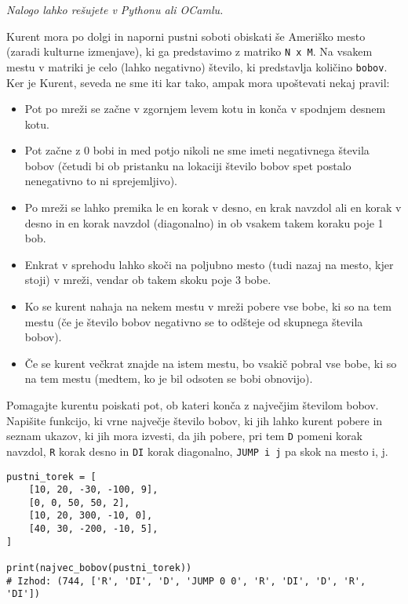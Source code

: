 \documentclass[arhiv]{../izpit}
\begin{document}
\naloga

\emph{Nalogo lahko rešujete v Pythonu ali OCamlu.}

Kurent mora po dolgi in naporni pustni soboti obiskati še Ameriško mesto (zaradi kulturne izmenjave), ki ga predstavimo z matriko \verb|N x M|.
Na vsakem mestu v matriki je celo (lahko negativno) število, ki predstavlja količino \verb|bobov|.
Ker je Kurent, seveda ne sme iti kar tako, ampak mora upoštevati nekaj pravil:
\begin{itemize}
  \item Pot po mreži se začne v zgornjem levem kotu in konča v spodnjem desnem kotu.
  \item Pot začne z 0 bobi in med potjo nikoli ne sme imeti negativnega števila bobov (četudi bi ob pristanku na lokaciji število bobov spet postalo nenegativno to ni sprejemljivo).
  \item Po mreži se lahko premika le en korak v desno, en krak navzdol ali en korak v desno in en korak navzdol (diagonalno) in ob vsakem takem koraku poje 1 bob.
  \item Enkrat v sprehodu lahko skoči na poljubno mesto (tudi nazaj na mesto, kjer stoji) v mreži, vendar ob takem skoku poje 3 bobe.
  \item Ko se kurent nahaja na nekem mestu v mreži pobere vse bobe, ki so na tem mestu (če je število bobov negativno se to odšteje od skupnega števila bobov).
  \item Če se kurent večkrat znajde na istem mestu, bo vsakič pobral vse bobe, ki so na tem mestu (medtem, ko je bil odsoten se bobi obnovijo).
\end{itemize}

Pomagajte kurentu poiskati pot, ob kateri konča z največjim številom bobov.
Napišite funkcijo, ki vrne največje število bobov, ki jih lahko kurent pobere in seznam ukazov, ki jih mora izvesti, da jih pobere, pri tem \verb|D| pomeni korak navzdol, \verb|R| korak desno in \verb|DI| korak diagonalno, \verb|JUMP i j| pa skok na mesto i, j.

\begin{verbatim}
pustni_torek = [
    [10, 20, -30, -100, 9],
    [0, 0, 50, 50, 2],
    [10, 20, 300, -10, 0],
    [40, 30, -200, -10, 5],
]

print(najvec_bobov(pustni_torek))
# Izhod: (744, ['R', 'DI', 'D', 'JUMP 0 0', 'R', 'DI', 'D', 'R', 'DI'])
\end{verbatim}
\end{document}
